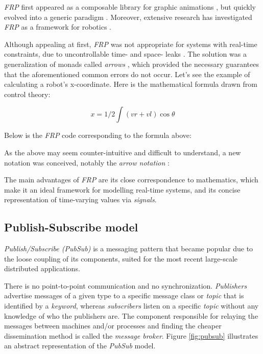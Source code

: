 \documentclass[sigplan,review,anonymous]{acmart}\settopmatter{printfolios=true}
\begin{document}
\textit{FRP} first appeared as a composable library for graphic animations \cite{fran}, but quickly evolved into a generic paradigm \cite{survey_frp,real_frp,pushpull_frp}. Moreover, extensive research has investigated \textit{FRP} as a framework for robotics \cite{arrows_robots,lambda_in_motion}. 

Although appealing at first, \textit{FRP} was not appropriate for systems  with real-time constraints, due to uncontrollable time- and space- leaks \cite{event_frp}. The solution was a generalization of monads called \textit{arrows} \cite{arrows}, which provided the necessary guarantees that the aforementioned common errors do not occur. Let's see the example of calculating a robot's x-coordinate. Here is the mathematical formula drawn from control theory:

$$ x = 1/2 \int (vr + vl) \cos\theta $$ 

Below is the \textit{FRP} code corresponding to the formula above:


As the above may seem counter-intuitive and difficult to understand, a new notation was conceived, notably the \textit{arrow notation} \cite{arrows_notation}:


The main advantages of \textit{FRP} are its close correspondence to mathematics\cite{survey_frp}, which make it an ideal framework for modelling real-time systems, and its concise representation of time-varying values via \textit{signals}.

\subsection{Publish-Subscribe model}

\textit{Publish/Subscribe (PubSub)} is a messaging pattern that became popular due to the loose coupling of its components, suited for the most recent large-scale distributed applications.

There is no point-to-point communication and no synchronization. \textit{Publishers} advertise messages of a given type to a specific message class or \textit{topic} that is identified by a \textit{keyword}, whereas \textit{subscribers} listen on a specific \textit{topic} without any knowledge of who the publishers are. The component responsible for relaying the messages between machines and/or processes and finding the cheaper dissemination method is called the \textit{message broker}. Figure \ref{fig:pubsub} illustrates an abstract representation of the \textit{PubSub} model.
\end{document}
